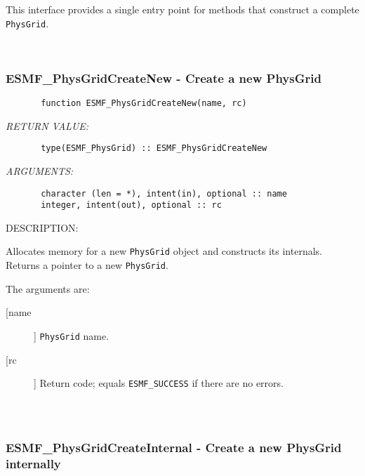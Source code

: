        This interface provides a single entry point for methods that construct
       a complete {\tt PhysGrid}.
   
 
\mbox{}\hrulefill\ 
 
\subsubsection{ESMF\_PhysGridCreateNew - Create a new PhysGrid}


 
\begin{verbatim}       function ESMF_PhysGridCreateNew(name, rc)\end{verbatim}{\em RETURN VALUE:}
\begin{verbatim}       type(ESMF_PhysGrid) :: ESMF_PhysGridCreateNew\end{verbatim}{\em ARGUMENTS:}
\begin{verbatim}       character (len = *), intent(in), optional :: name  
       integer, intent(out), optional :: rc               
 \end{verbatim}
{\sf DESCRIPTION:\\ }


       Allocates memory for a new {\tt PhysGrid} object and constructs its
       internals.  Returns a pointer to a new {\tt PhysGrid}.
  
       The arguments are:
       \begin{description}
       \item[[name]]
            {\tt PhysGrid} name.
       \item[[rc]] 
            Return code; equals {\tt ESMF\_SUCCESS} if there are no errors.
     \end{description}
  
\begin{verbatim} \end{verbatim}
 
 
\mbox{}\hrulefill\ 
 
\subsubsection{ESMF\_PhysGridCreateInternal - Create a new PhysGrid internally}


